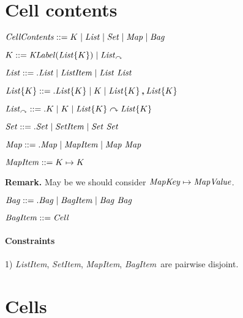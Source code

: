 \documentclass[draft]{article}
\newcommand{\CellContents}{{\it CellContents}}
\newcommand{\List}{{\it List}}
\newcommand{\ListItem}{{\it ListItem}}
\newcommand{\Set}{{\it Set}}
\newcommand{\SetItem}{{\it SetItem}}
\newcommand{\Map}{{\it Map}}
\newcommand{\MapItem}{{\it MapItem}}
\newcommand{\Bag}{{\it Bag}}
\newcommand{\BagItem}{{\it BagItem}}
\newcommand{\KLabel}{{\it KLabel}}
\newcommand{\Cell}{{\it Cell}}
\newcommand{\kra}{\curvearrowright}
\newcommand{\klsep}{\mbox{\,,\!,\,}}
\begin{document}
\section{Cell contents}

$\CellContents ::= K \mid \List \mid\Set\mid\Map\mid \Bag$

\noindent
$K ::= \KLabel(\List\{K\})\mid\List_{\kra}$

\noindent
$\List ::= .\List\mid\ListItem\mid \List~\List$

\noindent
$\List\{K\} ::= .\List\{K\}\mid K\mid \List\{K\} \klsep\List\{K\}$

\noindent
$\List_{\kra} ::= .K\mid K\mid \List\{K\}\kra\List\{K\}$

\noindent
$\Set ::= .\Set\mid\SetItem\mid \Set~\Set$

\noindent
$\Map ::= .\Map\mid\MapItem\mid \Map~\Map$

\noindent
$\MapItem ::= K \mapsto K$

\noindent
\textbf{Remark.} May be we should consider ${\it MapKey} \mapsto {\it MapValue}$.

\noindent
$\Bag ::= .\Bag\mid\BagItem\mid \Bag~\Bag$

\noindent
$\BagItem ::= \Cell$

\paragraph{Constraints}
1) \ListItem, \SetItem, \MapItem, \BagItem\ are pairwise disjoint.

\section{Cells}
\end{document}
